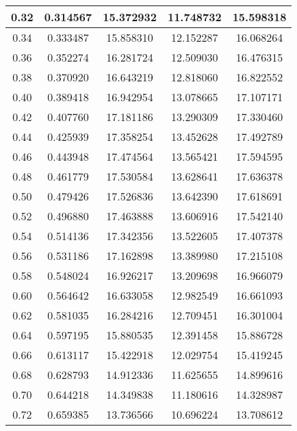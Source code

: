 \documentclass[column,amsmath,amssymb,floatfix]{revtex4}
\begin{document}
\begin{enumerate}
\begin{enumerate}
\begin{table}[H]
\begin{tabular}{|c|c|c|c|c|}
                        0.32 & 0.314567 & 15.372932 & 11.748732 & 15.598318 \\ \hline
                        0.34 & 0.333487 & 15.858310 & 12.152287 & 16.068264 \\ \hline
                        0.36 & 0.352274 & 16.281724 & 12.509030 & 16.476315 \\ \hline
                        0.38 & 0.370920 & 16.643219 & 12.818060 & 16.822552 \\ \hline
                        0.40 & 0.389418 & 16.942954 & 13.078665 & 17.107171 \\ \hline
                        0.42 & 0.407760 & 17.181186 & 13.290309 & 17.330460 \\ \hline
                        0.44 & 0.425939 & 17.358254 & 13.452628 & 17.492789 \\ \hline
                        0.46 & 0.443948 & 17.474564 & 13.565421 & 17.594595 \\ \hline
                        0.48 & 0.461779 & 17.530584 & 13.628641 & 17.636378 \\ \hline
                        0.50 & 0.479426 & 17.526836 & 13.642390 & 17.618691 \\ \hline
                        0.52 & 0.496880 & 17.463888 & 13.606916 & 17.542140 \\ \hline
                        0.54 & 0.514136 & 17.342356 & 13.522605 & 17.407378 \\ \hline
                        0.56 & 0.531186 & 17.162898 & 13.389980 & 17.215108 \\ \hline
                        0.58 & 0.548024 & 16.926217 & 13.209698 & 16.966079 \\ \hline
                        0.60 & 0.564642 & 16.633058 & 12.982549 & 16.661093 \\ \hline
                        0.62 & 0.581035 & 16.284216 & 12.709451 & 16.301004 \\ \hline
                        0.64 & 0.597195 & 15.880535 & 12.391458 & 15.886728 \\ \hline
                        0.66 & 0.613117 & 15.422918 & 12.029754 & 15.419245 \\ \hline
                        0.68 & 0.628793 & 14.912336 & 11.625655 & 14.899616 \\ \hline
                        0.70 & 0.644218 & 14.349838 & 11.180616 & 14.328987 \\ \hline
                        0.72 & 0.659385 & 13.736566 & 10.696224 & 13.708612 \\ \hline

\end{tabular}
\end{table}
\end{enumerate}
\end{enumerate}
\end{document}
